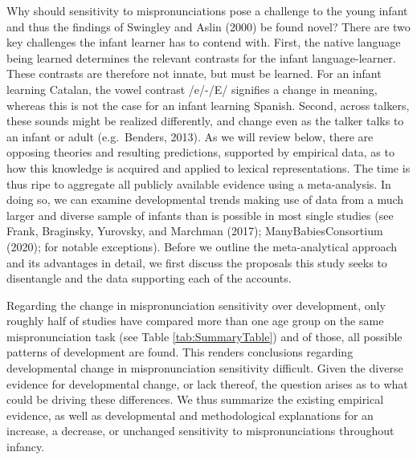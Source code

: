 \documentclass[man]{apa6}
\begin{document}
Why should sensitivity to mispronunciations pose a challenge to the young infant and thus the findings of Swingley and Aslin (2000) be found novel? There are two key challenges the infant learner has to contend with. First, the native language being learned determines the relevant contrasts for the infant language-learner. These contrasts are therefore not innate, but must be learned. For an infant learning Catalan, the vowel contrast /e/-/E/ signifies a change in meaning, whereas this is not the case for an infant learning Spanish. Second, across talkers, these sounds might be realized differently, and change even as the talker talks to an infant or adult (e.g.~Benders, 2013). As we will review below, there are opposing theories and resulting predictions, supported by empirical data, as to how this knowledge is acquired and applied to lexical representations. The time is thus ripe to aggregate all publicly available evidence using a meta-analysis. In doing so, we can examine developmental trends making use of data from a much larger and diverse sample of infants than is possible in most single studies (see Frank, Braginsky, Yurovsky, and Marchman (2017); ManyBabiesConsortium (2020); for notable exceptions). Before we outline the meta-analytical approach and its advantages in detail, we first discuss the proposals this study seeks to disentangle and the data supporting each of the accounts.

Regarding the change in mispronunciation sensitivity over development, only roughly half of studies have compared more than one age group on the same mispronunciation task (see Table \ref{tab:SummaryTable}) and of those, all possible patterns of development are found. This renders conclusions regarding developmental change in mispronunciation sensitivity difficult. Given the diverse evidence for developmental change, or lack thereof, the question arises as to what could be driving these differences. We thus summarize the existing empirical evidence, as well as developmental and methodological explanations for an increase, a decrease, or unchanged sensitivity to mispronunciations throughout infancy.
\end{document}
